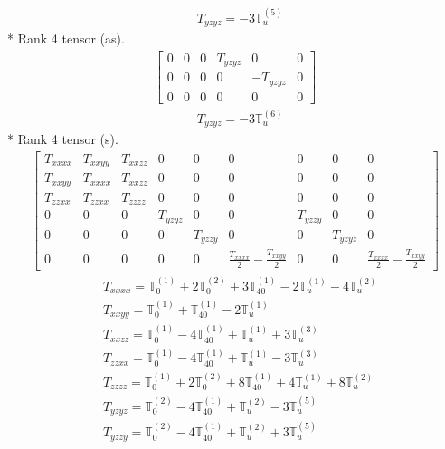 \documentclass[fleqn,8pt,landscape]{jsarticle}
\begin{document}
\begin{align*}
& T_{yzyz} = - 3 \mathbb{T}_{u}^{(5)}
\end{align*}
* Rank 4 tensor (as).
\begin{align*}
\begin{bmatrix} 0 & 0 & 0 & T_{yzyz} & 0 & 0 \\ 0 & 0 & 0 & 0 & - T_{yzyz} & 0 \\ 0 & 0 & 0 & 0 & 0 & 0 \end{bmatrix}
\end{align*}
\begin{align*}
& T_{yzyz} = - 3 \mathbb{T}_{u}^{(6)}
\end{align*}
* Rank 4 tensor (s).
\begin{align*}
\begin{bmatrix} T_{xxxx} & T_{xxyy} & T_{xxzz} & 0 & 0 & 0 & 0 & 0 & 0 \\ T_{xxyy} & T_{xxxx} & T_{xxzz} & 0 & 0 & 0 & 0 & 0 & 0 \\ T_{zzxx} & T_{zzxx} & T_{zzzz} & 0 & 0 & 0 & 0 & 0 & 0 \\ 0 & 0 & 0 & T_{yzyz} & 0 & 0 & T_{yzzy} & 0 & 0 \\ 0 & 0 & 0 & 0 & T_{yzzy} & 0 & 0 & T_{yzyz} & 0 \\ 0 & 0 & 0 & 0 & 0 & \frac{T_{xxxx}}{2} - \frac{T_{xxyy}}{2} & 0 & 0 & \frac{T_{xxxx}}{2} - \frac{T_{xxyy}}{2} \end{bmatrix}
\end{align*}
\begin{align*}
& T_{xxxx} = \mathbb{T}_{0}^{(1)} + 2 \mathbb{T}_{0}^{(2)} + 3 \mathbb{T}_{40}^{(1)} - 2 \mathbb{T}_{u}^{(1)} - 4 \mathbb{T}_{u}^{(2)} \\
& T_{xxyy} = \mathbb{T}_{0}^{(1)} + \mathbb{T}_{40}^{(1)} - 2 \mathbb{T}_{u}^{(1)} \\
& T_{xxzz} = \mathbb{T}_{0}^{(1)} - 4 \mathbb{T}_{40}^{(1)} + \mathbb{T}_{u}^{(1)} + 3 \mathbb{T}_{u}^{(3)} \\
& T_{zzxx} = \mathbb{T}_{0}^{(1)} - 4 \mathbb{T}_{40}^{(1)} + \mathbb{T}_{u}^{(1)} - 3 \mathbb{T}_{u}^{(3)} \\
& T_{zzzz} = \mathbb{T}_{0}^{(1)} + 2 \mathbb{T}_{0}^{(2)} + 8 \mathbb{T}_{40}^{(1)} + 4 \mathbb{T}_{u}^{(1)} + 8 \mathbb{T}_{u}^{(2)} \\
& T_{yzyz} = \mathbb{T}_{0}^{(2)} - 4 \mathbb{T}_{40}^{(1)} + \mathbb{T}_{u}^{(2)} - 3 \mathbb{T}_{u}^{(5)} \\
& T_{yzzy} = \mathbb{T}_{0}^{(2)} - 4 \mathbb{T}_{40}^{(1)} + \mathbb{T}_{u}^{(2)} + 3 \mathbb{T}_{u}^{(5)}
\end{align*}
\end{document}
